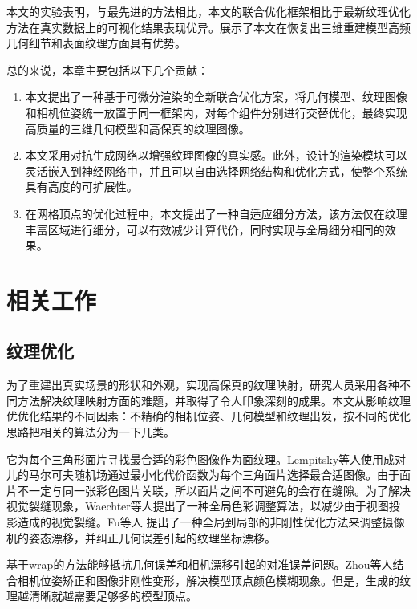 本文的实验表明，与最先进的方法相比，本文的联合优化框架相比于最新纹理优化方法在真实数据上的可视化结果表现优异。展示了本文在恢复出三维重建模型高频几何细节和表面纹理方面具有优势。\par
总的来说，本章主要包括以下几个贡献：\par
\begin{enumerate}
\item 本文提出了一种基于可微分渲染的全新联合优化方案，将几何模型、纹理图像和相机位姿统一放置于同一框架内，对每个组件分别进行交替优化，最终实现高质量的三维几何模型和高保真的纹理图像。
\item 本文采用对抗生成网络以增强纹理图像的真实感。此外，设计的渲染模块可以灵活嵌入到神经网络中，并且可以自由选择网络结构和优化方式，使整个系统具有高度的可扩展性。
\item 在网格顶点的优化过程中，本文提出了一种自适应细分方法，该方法仅在纹理丰富区域进行细分，可以有效减少计算代价，同时实现与全局细分相同的效果。
\end{enumerate}

\section{相关工作}
\subsection{纹理优化}
为了重建出真实场景的形状和外观，实现高保真的纹理映射，研究人员采用各种不同方法解决纹理映射方面的难题，并取得了令人印象深刻的成果。本文从影响纹理优优化结果的不同因素：不精确的相机位姿、几何模型和纹理出发，按不同的优化思路把相关的算法分为一下几类。\par
\vspace*{2mm}它为每个三角形面片寻找最合适的彩色图像作为面纹理。Lempitsky等人使用成对儿的马尔可夫随机场通过最小化代价函数为每个三角面片选择最合适图像。由于面片不一定与同一张彩色图片关联，所以面片之间不可避免的会存在缝隙。为了解决视觉裂缝现象，Waechter等人提出了一种全局色彩调整算法，以减少由于视图投影造成的视觉裂缝。Fu等人 提出了一种全局到局部的非刚性优化方法来调整摄像机的姿态漂移，并纠正几何误差引起的纹理坐标漂移。\par
\vspace*{2mm}基于wrap的方法能够抵抗几何误差和相机漂移引起的对准误差问题。Zhou等人结合相机位姿矫正和图像非刚性变形，解决模型顶点颜色模糊现象。但是，生成的纹理越清晰就越需要足够多的模型顶点。\par


